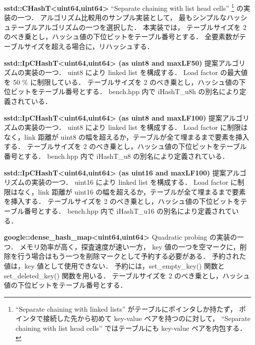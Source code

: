 %
{\bf sstd::CHashT<uint64,uint64>}
\samepage\newline\indent
``Separate chaining with list head cells''
\footnote{``Separate chaining with linked lists'' がテーブルにポインタしか持たず，
ポインタで接続した先から初めて key-value ペアを持つのに対して，
``Separate chaining with list head cells'' ではテーブルにも key-value ペアを内包する．} の実装の一つ．
アルゴリズム比較用のサンプル実装として，
最もシンプルなハッシュテーブルアルゴリズムの一つを選択した．
本実装では，
テーブルサイズを 2 のべき乗とし，ハッシュ値の下位ビットをテーブル番号とする．
全要素数がテーブルサイズを超える場合に，リハッシュする．
\leavevmode \newline

%
{\bf sstd::IpCHashT<uint64,uint64> (as uint8 and maxLF50)}
\samepage\newline\indent
提案アルゴリズムの実装の一つ．
uint8 により linked list を構成する．
Load factor の最大値を 50 \% に制限している．
テーブルサイズを 2 のべき乗とし，ハッシュ値の下位ビットをテーブル番号とする．
{\rm bench.hpp} 内で {\rm iHashT\_u8h} の別名により定義されている．
\leavevmode \newline

%
{\bf sstd::IpCHashT<uint64,uint64> (as uint8 and maxLF100)}
\samepage\newline\indent
提案アルゴリズムの実装の一つ．
uint8 により linked list を構成する．
Load factor に制限はなく，link 距離が uint8 の幅を超えるか，テーブルが全て埋まるまで要素を挿入する．
テーブルサイズを 2 のべき乗とし，ハッシュ値の下位ビットをテーブル番号とする．
{\rm bench.hpp} 内で {\rm iHashT\_u8} の別名により定義されている．
\leavevmode \newline

%
{\bf sstd::IpCHashT<uint64,uint64> (as uint16 and maxLF100)}
\samepage\newline\indent
提案アルゴリズムの実装の一つ．
uint16 により linked list を構成する．
Load factor に制限はなく，link 距離が uint16 の幅を超えるか，テーブルが全て埋まるまで要素を挿入する．
テーブルサイズを 2 のべき乗とし，ハッシュ値の下位ビットをテーブル番号とする．
{\rm bench.hpp} 内で {\rm iHashT\_u16} の別名により定義されている．
\leavevmode \newline

%
{\bf google::dense\_hash\_map<uint64,uint64>}
\samepage\newline\indent
Quadratic probing の実装の一つ．
メモリ効率が高く，探査速度が速い一方，
key 値の一つを空マークに，削除を行う場合はもう一つを削除マークとして予約する必要がある．
予約された値は，key 値として使用できない．
予約には，set\_empty\_key() 関数と set\_deleted\_key() 関数を用いる．
テーブルサイズを 2 のべき乗とし，ハッシュ値の下位ビットをテーブル番号とする．
\leavevmode \newline

